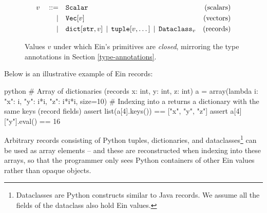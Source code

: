 \begin{figure}
    \centering
    \begin{align*}
    v \quad::=&\quad 
    \text{\texttt{Scalar}}
    & \text{(scalars)} \\
    \mid&\quad
    \text{\texttt{Vec}}[v]
    & \text{(vectors)} \\
    \mid&\quad
    \text{\texttt{dict}}[\text{\texttt{str}}, v] 
    \,\mid\, \text{\texttt{tuple}}[v, \dots] 
    \,\mid\, \texttt{Dataclass}_v
    & \text{(records)}
    \end{align*}
    \caption{Values $v$ under which Ein's primitives are \textit{closed}, mirroring the type annotations in Section \ref{type-annotations}.}
    \label{fig:ein-values}
\end{figure}

Below is an illustrative example of Ein records:
\begin{center} 
\begin{cminted}{python}
# Array of dictionaries (records {x: int, y: int, z: int})
a = array(lambda i: {"x": i, "y": i*i, "z": i*i*i}, size=10)
# Indexing into a returns a dictionary with the same keys (record fields)
assert list(a[4].keys()) == ["x", "y", "z"]
assert a[4]["y"].eval() == 16
\end{cminted}
\end{center}
Arbitrary records consisting of Python tuples, dictionaries, and dataclasses\footnote{Dataclasses are Python constructs similar to Java records. We assume all the fields of the dataclass also hold Ein values.} can be used as array elements -- and these are reconstructed when indexing into these arrays, so that the programmer only sees Python containers of other Ein values rather than opaque objects. 

